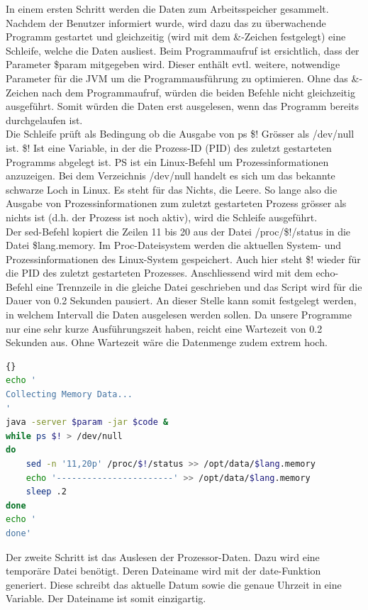 \documentclass{fancydocument}
\begin{document}
In einem ersten Schritt werden die Daten zum Arbeitsspeicher gesammelt. Nachdem der Benutzer informiert wurde, wird dazu das zu überwachende Programm gestartet und gleichzeitig (wird mit dem \&-Zeichen festgelegt) eine Schleife, welche die Daten ausliest. Beim Programmaufruf ist ersichtlich, dass der Parameter \$param mitgegeben wird. Dieser enthält evtl. weitere, notwendige Parameter für die JVM um die Programmausführung zu optimieren. Ohne das \&-Zeichen nach dem Programmaufruf, würden die beiden Befehle nicht gleichzeitig ausgeführt. Somit würden die Daten erst ausgelesen, wenn das Programm bereits durchgelaufen ist. 
\\
Die Schleife prüft als Bedingung ob die Ausgabe von ps \$! Grösser als /dev/null ist. \$! Ist eine Variable, in der die Prozess-ID (PID) des zuletzt gestarteten Programms abgelegt ist. PS ist ein Linux-Befehl um Prozessinformationen anzuzeigen. Bei dem Verzeichnis /dev/null handelt es sich um das bekannte schwarze Loch in Linux. Es steht für das Nichts, die Leere. So lange also die Ausgabe von Prozessinformationen zum zuletzt gestarteten Prozess grösser als nichts ist (d.h. der Prozess ist noch aktiv), wird die Schleife ausgeführt.
\\
Der sed-Befehl kopiert die Zeilen 11 bis 20 aus der Datei /proc/\$!/status in die Datei \$lang.memory. Im Proc-Dateisystem werden die aktuellen System- und Prozessinformationen des Linux-System gespeichert. Auch hier steht \$! wieder für die PID des zuletzt gestarteten Prozesses. Anschliessend wird mit dem echo-Befehl eine Trennzeile in die gleiche Datei geschrieben und das Script wird für die Dauer von 0.2 Sekunden pausiert. An dieser Stelle kann somit festgelegt werden, in welchem Intervall die Daten ausgelesen werden sollen. Da unsere Programme nur eine sehr kurze Ausführungszeit haben, reicht eine Wartezeit von 0.2 Sekunden aus. Ohne Wartezeit wäre die Datenmenge zudem extrem hoch.

\begin{minipage}{\textwidth}
\begin{lstlisting}[language=bash,caption=Speicherdaten sammeln]{}
echo '
Collecting Memory Data...
'
java -server $param -jar $code &
while ps $! > /dev/null
do
	sed -n '11,20p' /proc/$!/status >> /opt/data/$lang.memory
	echo '-----------------------' >> /opt/data/$lang.memory		
	sleep .2
done
echo '
done'
\end{lstlisting}
\end{minipage}

Der zweite Schritt ist das Auslesen der Prozessor-Daten. Dazu wird eine temporäre Datei benötigt. Deren Dateiname wird mit der date-Funktion generiert. Diese schreibt das aktuelle Datum sowie die genaue Uhrzeit in eine Variable. Der Dateiname ist somit einzigartig.
\end{document}
